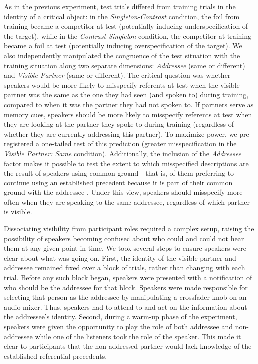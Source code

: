 \documentclass[natbib,doc,a4paper]{apa6}
\begin{document}
As in the previous experiment, test trials differed from training trials in the identity of a critical object: in the \emph{Singleton-Contrast} condition, the foil from training became a competitor at test (potentially inducing underspecification of the target), while in the \emph{Contrast-Singleton} condition, the competitor at training became a foil at test (potentially inducing overspecification of the target). We also independently manipulated the congruence of the test situation with the training situation along two separate dimensions: \emph{Addressee} (same or different) and \emph{Visible Partner} (same or different). The critical question was whether speakers would be more likely to misspecify referents at test when the visible partner was the same as the one they had seen (and spoken to) during training, compared to when it was the partner they had not spoken to.  If partners serve as memory cues, speakers should be more likely to misspecify referents at test when they are looking at the partner they spoke to during training (regardless of whether they are currently addressing this partner). To maximize power, we pre-registered a one-tailed test of this prediction (greater misspecification in the \emph{Visible Partner: Same} condition).  Additionally, the inclusion of the \emph{Addressee} factor makes it possible to test the extent to which misspecified descriptions are the result of speakers using common ground---that is, of them preferring to continue using an established precedent because it is part of their common ground with the addressee \citep{brennanclark96}. Under this view, speakers should misspecify more often when they are speaking to the same addressee, regardless of which partner is visible.

Dissociating visibility from participant roles required a complex setup, raising the possibility of speakers becoming confused about who could and could not hear them at any given point in time. We took several steps to ensure speakers were clear about what was going on. First, the identity of the visible partner and addressee remained fixed over a block of trials, rather than changing with each trial. Before any such block began, speakers were presented with a notification of who should be the addressee for that block. Speakers were made responsible for selecting that person as the addressee by manipulating a crossfader knob on an audio mixer. Thus, speakers had to attend to and act on the information about the addressee's identity. Second, during a warm-up phase of the experiment, speakers were given the opportunity to play the role of both addressee and non-addressee while one of the listeners took the role of the speaker. This made it clear to participants that the non-addressed partner would lack knowledge of the established referential precedents. 
\end{document}
